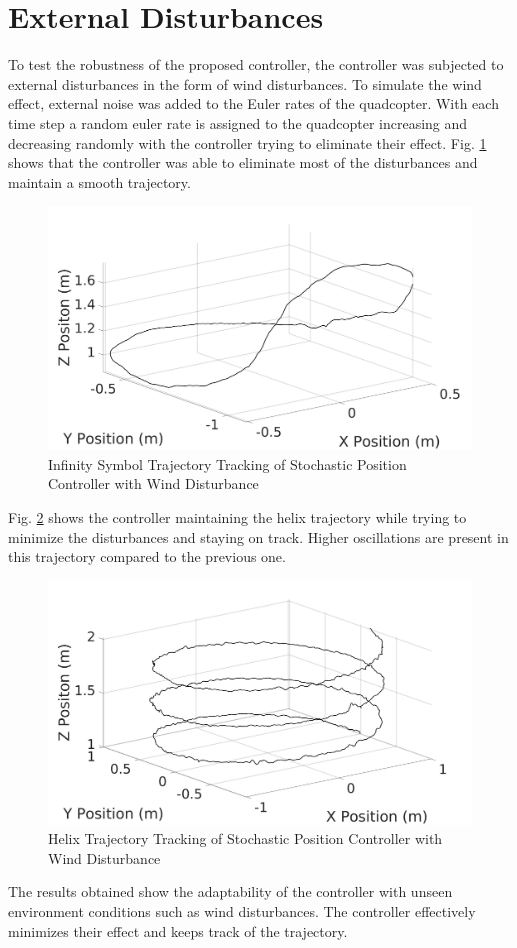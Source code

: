     \section{External Disturbances}
    To test the robustness of the proposed controller, the controller was subjected to external disturbances in the form of wind disturbances. To simulate the wind effect, external noise was added to the Euler rates of the quadcopter. With each time step a random euler rate is assigned to the quadcopter increasing and decreasing randomly with the controller trying to eliminate their effect. Fig. \ref{traj2w} shows that the controller was able to eliminate most of the disturbances and maintain a smooth trajectory. 
    \begin{figure}[H]
            \centering
            \includegraphics[width=1\textwidth]{plots/traj2W.jpg}
            \caption{Infinity Symbol Trajectory Tracking of Stochastic Position Controller with Wind Disturbance}
            \label{traj2w}
    \end{figure}\clearpage
    Fig. \ref{traj1w} shows the controller maintaining the helix trajectory while trying to minimize the disturbances and staying on track. Higher oscillations are present in this trajectory compared to the previous one.
    \begin{figure}[H]
            \centering
            \includegraphics[width=1\textwidth]{plots/traj1W.jpg}
            \caption{Helix Trajectory Tracking of Stochastic Position Controller with Wind Disturbance}
            \label{traj1w}
    \end{figure}
    The results obtained show the adaptability of the controller with unseen environment conditions such as wind disturbances. The controller effectively minimizes their effect and keeps track of the trajectory.\clearpage
